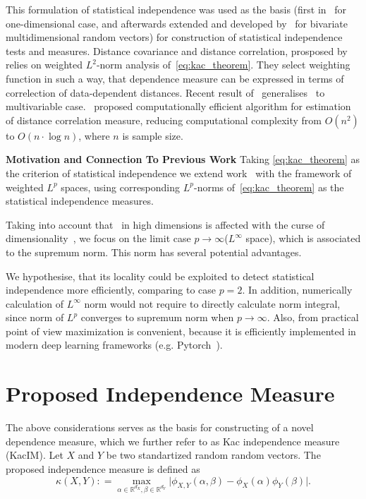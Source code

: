 \documentclass{article}
\begin{document}
This formulation of statistical independence was used as the basis (first in~\cite{Feuerverger} for one-dimensional case, and afterwards extended and developed by~\cite{Szekely} for bivariate multidimensional random vectors) for construction of statistical independence tests and measures. Distance covariance and distance correlation, prosposed by ~\cite{Szekely} relies on weighted $L^{2}$-norm analysis of~\eqref{eq:kac_theorem}. They select weighting function in such a way, that dependence measure can be expressed in terms of correlection of data-dependent distances. Recent result of~\cite{Bottcher} generalises~\cite{Szekely} to multivariable case.~\cite{CHAUDHURI201915} proposed computationally efficient algorithm for estimation of distance correlation measure, reducing computational complexity from $O(n^2)$ to $O(n\cdot \log n)$, where $n$ is sample size.

\textbf{Motivation and Connection To Previous Work} Taking \eqref{eq:kac_theorem} as the criterion of statistical independence we extend work~\cite{Szekely} with the framework of weighted $L^{p}$ spaces, using corresponding $L^{p}$-norms of~\eqref{eq:kac_theorem} as the statistical independence measures. 

Taking into account that~\cite{Szekely} in high dimensions is affected with the curse of dimensionality~\cite{Edlemann}, we focus on the limit case $p \rightarrow \infty$($L^{\infty}$ space), which is associated to the supremum norm. This norm has several potential advantages.


 
We hypothesise, that its locality could be exploited to detect statistical independence more efficiently, comparing to case $p=2$. 
In addition, numerically calculation of $L^{\infty} $ norm would not require to directly calculate norm integral, since norm of $L^{p}$ converges to supremum norm when $p \rightarrow \infty$. Also, from practical point of view maximization is convenient, because it is efficiently implemented in modern deep learning frameworks (e.g. Pytorch~\cite{NEURIPS2019_9015}).


\section{Proposed Independence Measure}
\label{section:proposed_method}



\noindent The above considerations serves as the basis for constructing of a novel dependence measure, which we further refer to as Kac independence measure (KacIM). Let $X$ and $Y$ be two standartized random random vectors. The proposed independence measure is defined as
\begin{equation}
\label{eq:kim}
    \kappa(X,Y): = \max_{\alpha \in \mathbb{R}^{d_{X}}, \beta \in \mathbb{R}^{d_{Y}}} \vert \phi_{X,Y}(\alpha, \beta)  -\phi_{X}(\alpha) \phi_{Y}(\beta) \vert.
\end{equation}
\end{document}
